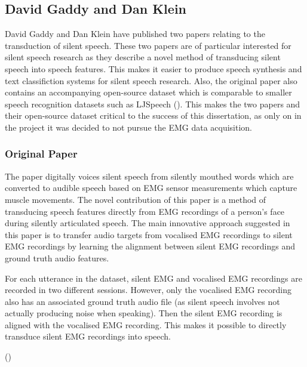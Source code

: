 \subsection{David Gaddy and Dan Klein}

David Gaddy and Dan Klein have published two papers relating to the transduction of
silent speech. These two papers are of particular interested for silent speech research
as they describe a novel method of transducing silent speech into speech features.
This makes it easier to produce speech synthesis and text classifiction systems
for silent speech research. Also, the original paper also contains an accompanying
open-source dataset which is comparable to smaller speech recognition datasets
such as LJSpeech (\cite{ljspeech17}). This makes the two papers and their open-source
dataset critical to the success of this dissertation, as only on in the project it
was decided to not pursue the EMG data acquisition.

\subsubsection{Original Paper}

The paper digitally voices silent speech from silently mouthed words which are
converted to audible speech based on EMG sensor measurements which capture muscle movements.
The novel contribution of this paper is  
a method of transducing speech features directly from EMG recordings
of a person's face during silently articulated speech. The main innovative approach
suggested in this paper is to transfer audio targets from vocalised EMG recordings
to silent EMG recordings by learning the alignment between silent EMG recordings
and ground truth audio features.

For each utterance in the dataset, silent EMG and vocalised EMG recordings are recorded
in two different sessions. However, only the vocalised EMG recording also has an associated
ground truth audio file (as silent speech involves not actually producing noise when
speaking). Then the silent EMG recording is aligned with the vocalised EMG recording.
This makes it possible to directly transduce silent EMG recordings into speech.


\iffalse
Other papers have used this approach to FILL REST OF THIS WITH REFERENCED TO SPEECH AND TO TEXT
FROM DIGITAL VOICING, MIT ALTER EGO 2018 SUMMARISED AND 60 PG VERSION AND OTHER SOURCES.
\fi

(\cite{gaddy2020digital})

